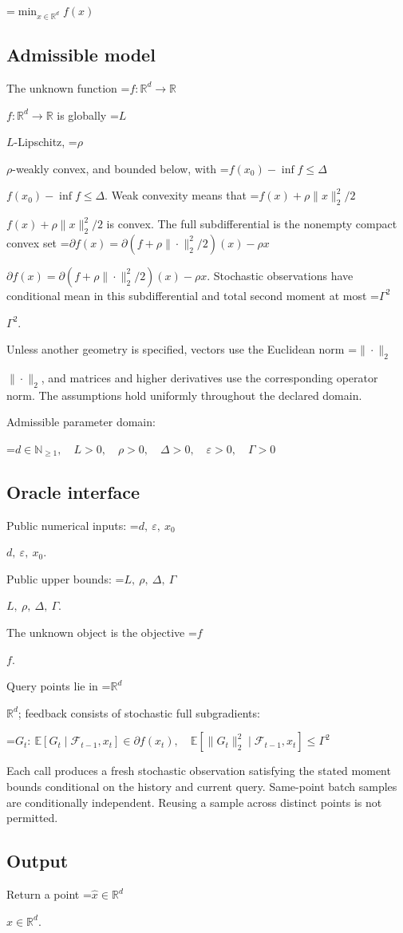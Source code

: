 \documentclass[10pt,a4paper]{article}
\newcommand{\AtlasMath}[1]{\par\begingroup\centering\setbox0=\hbox{$\displaystyle #1$}\ifdim\wd0>1.4\linewidth\typeout{ATLAS WIDE FORMULA: \the\wd0}\fi\ifdim\wd0>\linewidth\resizebox{\linewidth}{!}{\box0}\else\box0\fi\par\endgroup}
\newcommand{\AtlasInlineMath}[1]{\begingroup\setbox0=\hbox{$#1$}\ifdim\wd0>.4\linewidth\endgroup\AtlasMath{#1}\else\endgroup$#1$\fi}
\begin{document}
\AtlasMath{\min_{x\in \mathbb{R}^d}f(x)}


\subsection{Admissible model}
The unknown function \AtlasInlineMath{f:\mathbb R^d\to\mathbb R} is globally \AtlasInlineMath{L}-Lipschitz, \AtlasInlineMath{\rho}-weakly convex, and bounded below, with \AtlasInlineMath{f(x_0)-\inf f\le\Delta}. Weak convexity means that \AtlasInlineMath{f(x)+\rho\|x\|_2^2/2} is convex. The full subdifferential is the nonempty compact convex set \AtlasInlineMath{\partial f(x)=\partial(f+\rho\|\cdot\|_2^2/2)(x)-\rho x}. Stochastic observations have conditional mean in this subdifferential and total second moment at most \AtlasInlineMath{\Gamma^2}.

Unless another geometry is specified, vectors use the Euclidean norm \AtlasInlineMath{\|\cdot\|_2}, and matrices and higher derivatives use the corresponding operator norm. The assumptions hold uniformly throughout the declared domain.

Admissible parameter domain:


\AtlasMath{d\in\mathbb{N}_{\ge1},\quad L>0,\quad \rho>0,\quad \Delta>0,\quad \varepsilon>0,\quad \Gamma>0}


\subsection{Oracle interface}
Public numerical inputs: \AtlasInlineMath{d,\ \varepsilon,\ x_0}.

Public upper bounds: \AtlasInlineMath{L,\ \rho,\ \Delta,\ \Gamma}.

The unknown object is the objective \AtlasInlineMath{f}.

Query points lie in \AtlasInlineMath{\mathbb{R}^d}; feedback consists of stochastic full subgradients:


\AtlasMath{G_t:\ \mathbb{E}[G_t\mid\mathcal{F}_{t-1},x_t]\in\partial f(x_t),\quad\mathbb{E}[\|G_t\|_2^2\mid\mathcal{F}_{t-1},x_t]\le\Gamma^2}


Each call produces a fresh stochastic observation satisfying the stated moment bounds conditional on the history and current query. Same-point batch samples are conditionally independent. Reusing a sample across distinct points is not permitted.

\subsection{Output}
Return a point \AtlasInlineMath{\widehat x\in\mathbb R^d}.
\end{document}

